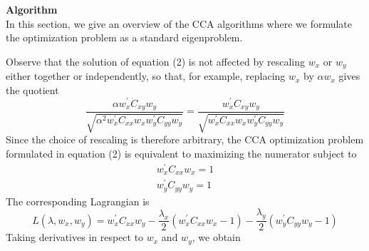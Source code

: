 \documentclass[fleqn,a4paper,11pt]{article}
\begin{document}
\noindent \textbf{Algorithm}\\

\noindent In this section, we give an overview of the CCA algorithms
where we formulate the optimization problem as a standard eigenproblem.

Observe that the solution of equation
(2) is not affected by rescaling $w_x$ or $w_y$ either together or independently,
so that, for example, replacing $w_x$ by $\alpha w_x$ gives the quotient
\begin{equation*}
\frac{\alpha w_x^{'}C_{xy} w_y }{\sqrt{\alpha^{2}w_x^{'}C_{xx} w_x w_y^{'}C_{yy} w_y}} =
\frac{ w_x^{'}C_{xy} w_y }{\sqrt{w_x^{'}C_{xx} w_x w_y^{'}C_{yy} w_y}}
\end{equation*}
\noindent Since the choice of rescaling is therefore arbitrary, the CCA optimization problem formulated in equation (2) is equivalent to maximizing the numerator subject to
\begin{align*}
w_x^{'}C_{xx} w_x = 1 \\
w_y^{'}C_{yy} w_y = 1 
\end{align*}
The corresponding Lagrangian is
\begin{equation*}
L(\lambda,w_x,w_y) = w_x^{'} C_{xx} w_y - \frac{\lambda_x}{2}(w_x^{'}C_{xx}w_x-1)- \frac{\lambda_y}{2}(w_y^{'}C_{yy}w_y-1)
\end{equation*}
Taking derivatives in respect to $w_x$ and $w_y$, we obtain
\end{document}
